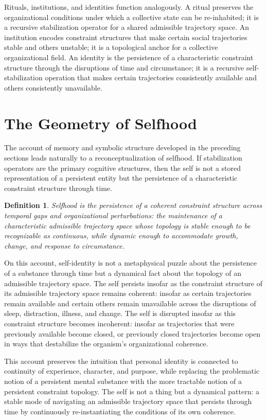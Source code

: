 \documentclass[12pt,a4paper]{report}
\theoremstyle{flyxion}
\newtheorem{definition}[theorem]{Definition}
\begin{document}
Rituals, institutions, and identities function analogously. A ritual preserves the organizational conditions under which a collective state can be re-inhabited; it is a recursive stabilization operator for a shared admissible trajectory space. An institution encodes constraint structures that make certain social trajectories stable and others unstable; it is a topological anchor for a collective organizational field. An identity is the persistence of a characteristic constraint structure through the disruptions of time and circumstance; it is a recursive self-stabilization operation that makes certain trajectories consistently available and others consistently unavailable.

\section{The Geometry of Selfhood}

The account of memory and symbolic structure developed in the preceding sections leads naturally to a reconceptualization of selfhood. If stabilization operators are the primary cognitive structures, then the self is not a stored representation of a persistent entity but the persistence of a characteristic constraint structure through time.

\begin{definition}
\emph{Selfhood} is the persistence of a coherent constraint structure across temporal gaps and organizational perturbations: the maintenance of a characteristic admissible trajectory space whose topology is stable enough to be recognizable as continuous, while dynamic enough to accommodate growth, change, and response to circumstance.
\end{definition}

On this account, self-identity is not a metaphysical puzzle about the persistence of a substance through time but a dynamical fact about the topology of an admissible trajectory space. The self persists insofar as the constraint structure of its admissible trajectory space remains coherent: insofar as certain trajectories remain available and certain others remain unavailable across the disruptions of sleep, distraction, illness, and change. The self is disrupted insofar as this constraint structure becomes incoherent: insofar as trajectories that were previously available become closed, or previously closed trajectories become open in ways that destabilize the organism's organizational coherence.

This account preserves the intuition that personal identity is connected to continuity of experience, character, and purpose, while replacing the problematic notion of a persistent mental substance with the more tractable notion of a persistent constraint topology. The self is not a thing but a dynamical pattern: a stable mode of navigating an admissible trajectory space that persists through time by continuously re-instantiating the conditions of its own coherence.
\end{document}
